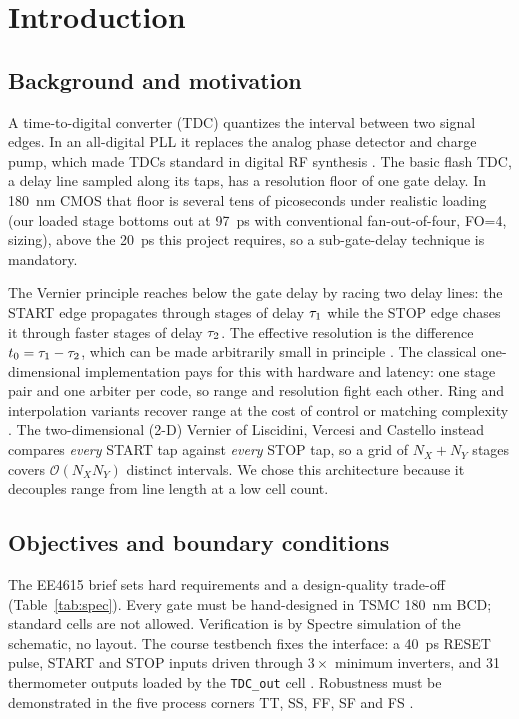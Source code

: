 \section{Introduction}
\label{sec:intro}

\subsection{Background and motivation}

A time-to-digital converter (TDC) quantizes the interval between two signal
edges. In an all-digital PLL it replaces the analog phase detector and charge
pump, which made TDCs standard in digital RF synthesis
\cite{staszewski2005, henzlerbook}. The basic flash TDC, a delay line sampled
along its taps, has a resolution floor of one gate delay. In
\SI{180}{\nano\meter} CMOS that floor is several tens of picoseconds under
realistic loading (our loaded stage bottoms out at \SI{97}{\pico\second} with
conventional fan-out-of-four, FO=4, sizing), above the \SI{20}{\pico\second}
this project requires, so a sub-gate-delay technique is mandatory.

The Vernier principle reaches below the gate delay by racing two delay lines:
the START edge propagates through stages of delay $\tau_{1}$ while the STOP
edge chases it through faster stages of delay $\tau_{2}$. The effective
resolution is the difference $t_{0}=\tau_{1}-\tau_{2}$, which can be made
arbitrarily small in principle \cite{dudek2000}. The classical one-dimensional
implementation pays for this with hardware and latency: one stage pair and one
arbiter per code, so range and resolution fight each other. Ring and
interpolation variants recover range at the cost of control or matching
complexity \cite{yu2010, henzler2008}. The two-dimensional (2-D) Vernier of
Liscidini, Vercesi and Castello \cite{liscidini2009, vercesi2010} instead
compares \emph{every} START tap against \emph{every} STOP tap, so a grid of
$N_X+N_Y$ stages covers $\mathcal{O}(N_X N_Y)$ distinct intervals. We chose
this architecture because it decouples range from line length at a low cell
count.

\subsection{Objectives and boundary conditions}

The EE4615 brief sets hard requirements and a design-quality trade-off
(Table~\ref{tab:spec}). Every gate must be hand-designed in TSMC
\SI{180}{\nano\meter} BCD; standard cells are not allowed. Verification is by
Spectre simulation of the schematic, no layout. The course testbench fixes the
interface: a \SI{40}{\pico\second} RESET pulse, START and STOP inputs driven
through $3\times$ minimum inverters, and 31 thermometer outputs loaded by the
\texttt{TDC\_out} cell \cite{ee4615tb}. Robustness must be demonstrated in
the five process corners TT, SS, FF, SF and FS \cite{ee4615corner}.

